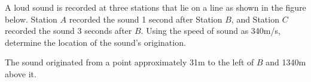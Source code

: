 {A loud sound is recorded at three stations that lie on a line as shown in the figure below. Station $A$ recorded the sound 1 second after Station $B$, and Station $C$ recorded the sound 3 seconds after $B$. Using the speed of sound as 340m/s, determine the location of the sound's origination.

\hfill {} \hfill \null
}
{The sound originated from a point approximately 31m to the left of $B$ and 1340m above it.
}
